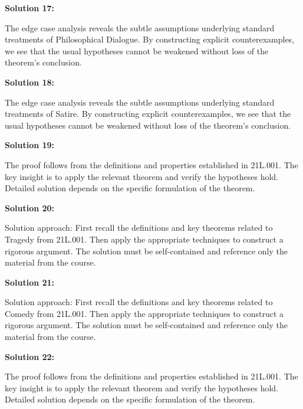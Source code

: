 \documentclass[12pt,a4paper]{exam}
\begin{document}
\vspace{0.5cm}

\textbf{Solution 17:}

The edge case analysis reveals the subtle assumptions underlying standard treatments of Philosophical Dialogue. By constructing explicit counterexamples, we see that the usual hypotheses cannot be weakened without loss of the theorem's conclusion.

\vspace{0.5cm}

\textbf{Solution 18:}

The edge case analysis reveals the subtle assumptions underlying standard treatments of Satire. By constructing explicit counterexamples, we see that the usual hypotheses cannot be weakened without loss of the theorem's conclusion.

\vspace{0.5cm}

\textbf{Solution 19:}

The proof follows from the definitions and properties established in 21L.001. The key insight is to apply the relevant theorem and verify the hypotheses hold. Detailed solution depends on the specific formulation of the theorem.

\vspace{0.5cm}

\textbf{Solution 20:}

Solution approach: First recall the definitions and key theorems related to Tragedy from 21L.001. Then apply the appropriate techniques to construct a rigorous argument. The solution must be self-contained and reference only the material from the course.

\vspace{0.5cm}

\textbf{Solution 21:}

Solution approach: First recall the definitions and key theorems related to Comedy from 21L.001. Then apply the appropriate techniques to construct a rigorous argument. The solution must be self-contained and reference only the material from the course.

\vspace{0.5cm}

\textbf{Solution 22:}

The proof follows from the definitions and properties established in 21L.001. The key insight is to apply the relevant theorem and verify the hypotheses hold. Detailed solution depends on the specific formulation of the theorem.
\end{document}
